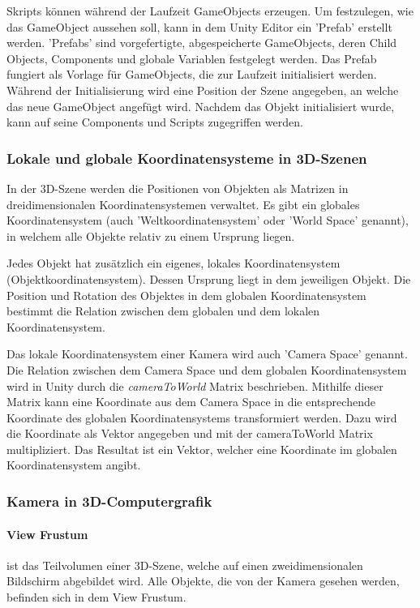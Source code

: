 Skripts können während der Laufzeit GameObjects erzeugen. Um festzulegen, wie das GameObject aussehen soll, kann in dem Unity Editor ein 'Prefab' erstellt werden. 'Prefabs' sind vorgefertigte, abgespeicherte GameObjects, deren Child Objects, Components und globale Variablen festgelegt werden. Das Prefab fungiert als Vorlage für GameObjects, die zur Laufzeit initialisiert werden. Während der Initialisierung wird eine Position der Szene angegeben, an welche das neue GameObject angefügt wird. Nachdem das Objekt initialisiert wurde, kann auf seine Components und Scripts zugegriffen werden.\citep{unityprefabs}


\subsubsection{Lokale und globale Koordinatensysteme in 3D-Szenen}
In der 3D-Szene werden die Positionen von Objekten als Matrizen in dreidimensionalen Koordinatensystemen verwaltet. Es gibt ein globales Koordinatensystem (auch 'Weltkoordinatensystem' oder 'World Space' genannt), in welchem alle Objekte relativ zu einem Ursprung liegen. 

Jedes Objekt hat zusätzlich ein eigenes, lokales Koordinatensystem (Objektkoordinatensystem). Dessen Ursprung liegt in dem jeweiligen Objekt. Die Position und Rotation des Objektes in dem globalen Koordinatensystem bestimmt die Relation zwischen dem globalen und dem lokalen Koordinatensystem. 

Das lokale Koordinatensystem einer Kamera wird auch 'Camera Space' genannt. Die Relation zwischen dem Camera Space und dem globalen Koordinatensystem wird in Unity durch die \textit{cameraToWorld} Matrix beschrieben. Mithilfe dieser Matrix kann eine Koordinate aus dem Camera Space in die entsprechende Koordinate des globalen Koordinatensystems transformiert werden. Dazu wird die Koordinate als Vektor angegeben und mit der cameraToWorld Matrix multipliziert. Das Resultat ist ein Vektor, welcher eine Koordinate im globalen Koordinatensystem angibt.\citep{unitycameratoworldmatrix,unitymultiplyoint}

\subsubsection{Kamera in 3D-Computergrafik}
\paragraph{View Frustum}
ist das Teilvolumen einer 3D-Szene, welche auf einen zweidimensionalen Bildschirm abgebildet wird. Alle Objekte, die von der Kamera gesehen werden, befinden sich in dem View Frustum.

